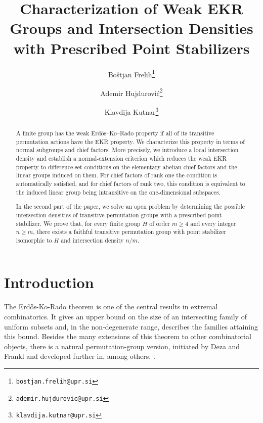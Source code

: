 \documentclass[11pt]{article}
\title{Characterization of Weak EKR Groups and Intersection Densities with Prescribed Point Stabilizers}
\author[1]{Bo\v stjan Frelih\thanks{\texttt{bostjan.frelih@upr.si}}}
\author[1]{Ademir Hujdurovi\'c\thanks{\texttt{ademir.hujdurovic@upr.si}}}
\author[1]{Klavdija Kutnar\thanks{\texttt{klavdija.kutnar@upr.si}}}
\affil[1]{University of Primorska, UP FAMNIT and UP IAM, Koper, Slovenia}
\begin{document}
\maketitle




\begin{abstract}
A finite group has the weak Erd\H{o}s--Ko--Rado property if all of its transitive permutation actions have the EKR property. We characterize
this property in terms of normal subgroups and chief factors. More
precisely, we introduce a local intersection density and establish a
normal-extension criterion which reduces the weak EKR property to
difference-set conditions on the elementary abelian chief factors and
the linear groups induced on them. For chief factors of rank one the condition is automatically satisfied, and for chief factors of rank two, this
condition is equivalent to the induced linear group being intransitive
on the one-dimensional subspaces.

In the second part of the paper, we solve an open problem by determining the possible intersection
densities of transitive permutation groups with a prescribed point
stabilizer. We prove that, for every finite group $H$ of order
$m\geq 4$ and every integer $n\geq m$, there exists a faithful
transitive permutation group with point stabilizer isomorphic to $H$
and intersection density $n/m$.
\end{abstract}

\begin{quotation}
\end{quotation}
\begin{quotation}
\end{quotation}




\section{Introduction}

The Erd\H{o}s-Ko-Rado theorem \cite{ErdosKoRado1961} is one of the
central results in extremal combinatorics. It gives an upper bound on
the size of an intersecting family of uniform subsets and, in the
non-degenerate range, describes the families attaining this bound.
Besides the many extensions of this theorem to other combinatorial
objects, there is a natural permutation-group version, initiated by
Deza and Frankl \cite{DezaFrankl1977} and developed further in, among
others,
\cite{CameronKu2003,GodsilMeagher2009,GodsilMeagher2016}.
\end{document}
